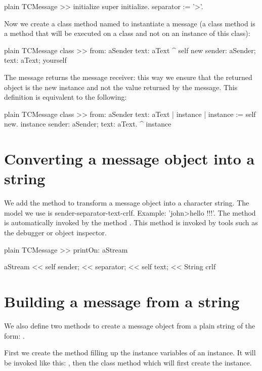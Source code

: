 \documentclass[10pt,twoside,english]{_support/latex/sbabook/sbabook}
\begin{document}
\begin{displaycode}{plain}
TCMessage >> initialize
	super initialize.
	separator := '>'.
\end{displaycode}

Now we create a class method named  to instantiate a message (a class method is a method that will be executed on a class and not on an instance of this class):

\begin{displaycode}{plain}
TCMessage class >> from: aSender text: aText
	^ self new sender: aSender; text: aText; yourself
\end{displaycode}

The message  returns the message receiver: this way we ensure that the returned object is the new instance and not the value returned by the  message. This definition is equivalent to the following:

\begin{displaycode}{plain}
TCMessage class >> from: aSender text: aText
	| instance |
	instance := self new.
	instance sender: aSender; text: aText.
	^ instance
\end{displaycode}
\section{Converting a message object into a string}
We add the method  to transform a message object into a character string.
The model we use is sender-separator-text-crlf. Example: 'john\textgreater{}hello !!!'.
The method  is automatically invoked by the method . This method is invoked by tools such
as the debugger or object inspector. 

\begin{displaycode}{plain}
TCMessage >> printOn: aStream

	aStream 
		<< self sender; << separator; 
		<< self text; << String crlf
\end{displaycode}
\section{Building a message from a string }
We also define two methods to create a message object from a plain string of the form: .

First we create the method  filling up the instance variables of an instance. It will be invoked like this: , then the class method  which will first create the instance.
\end{document}
